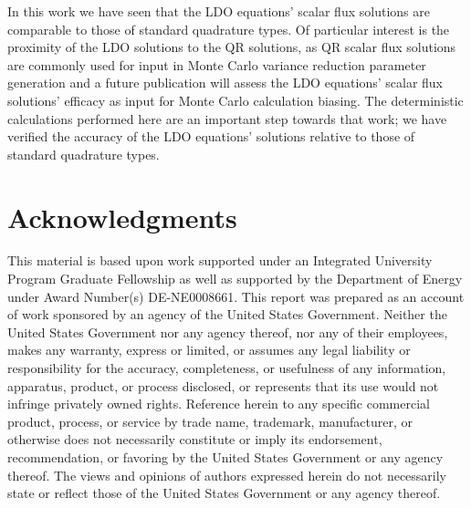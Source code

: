 \documentclass{article} %
\begin{document}
In this work we have seen that the LDO equations' scalar flux solutions are
comparable to those of standard quadrature types. Of particular interest is
the proximity of the LDO solutions to the QR solutions, as QR scalar flux
solutions are commonly used for input in Monte Carlo variance reduction
parameter generation and a future publication will assess the LDO equations'
scalar flux solutions' efficacy as input for Monte Carlo calculation biasing.
The deterministic calculations performed here are an important step towards
that work; we have verified the accuracy of the LDO equations' solutions
relative to those of standard quadrature types.

\pagebreak
\section*{Acknowledgments}

This material is based upon work supported under an Integrated
University Program Graduate Fellowship as well as supported by the Department 
of Energy under Award Number(s) DE-NE0008661. This report was prepared as an
account of work sponsored by an agency of the United States Government.
Neither the United States Government nor any agency thereof, nor any of their
employees, makes any warranty, express or limited, or assumes any legal
liability or responsibility for the accuracy, completeness, or usefulness of
any information, apparatus, product, or process disclosed, or represents that
its use would not infringe privately owned rights. Reference herein to any 
specific commercial product, process, or service by trade name, trademark, 
manufacturer, or otherwise does not necessarily constitute or imply its 
endorsement, recommendation, or favoring by the United States Government or
any agency thereof. The views and opinions of authors expressed herein do not 
necessarily state or reflect those of the United States Government or any 
agency thereof.

\pagebreak



\end{document}

